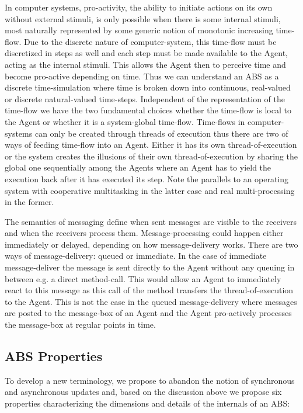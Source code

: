 In computer systems, pro-activity, the ability to initiate actions on its own without external stimuli, is only possible when there is some internal stimuli, most naturally represented by some generic notion of monotonic increasing time-flow. Due to the discrete nature of computer-system, this time-flow must be discretized in steps as well and each step must be made available to the Agent, acting as the internal stimuli. This allows the Agent then to perceive time and become pro-active depending on time. Thus we can understand an ABS as a discrete time-simulation where time is broken down into continuous, real-valued or discrete natural-valued time-steps. Independent of the representation of the time-flow we have the two fundamental choices whether the time-flow is local to the Agent or whether it is a system-global time-flow. Time-flows in computer-systems can only be created through threads of execution thus there are two of ways of feeding time-flow into an Agent. Either it has its own thread-of-execution or the system creates the illusions of their own thread-of-execution by sharing the global one sequentially among the Agents where an Agent has to yield the execution back after it has executed its step. Note the parallels to an operating system with cooperative multitasking in the latter case and real multi-processing in the former.

\medskip 

The semantics of messaging define when sent messages are visible to the receivers and when the receivers process them. Message-processing could happen either immediately or delayed, depending on how message-delivery works. There are two ways of message-delivery: queued or immediate. In the case of immediate message-deliver the message is sent directly to the Agent without any queuing in between e.g. a direct method-call. This would allow an Agent to immediately react to this message as this call of the method transfers the thread-of-execution to the Agent. This is not the case in the queued message-delivery where messages are posted to the message-box of an Agent and the Agent pro-actively processes the message-box at regular points in time.

\subsection{ABS Properties}
To develop a new terminology, we propose to abandon the notion of synchronous and asynchronous updates and, based on the discussion above we propose six properties characterizing the dimensions and details of the internals of an ABS:


